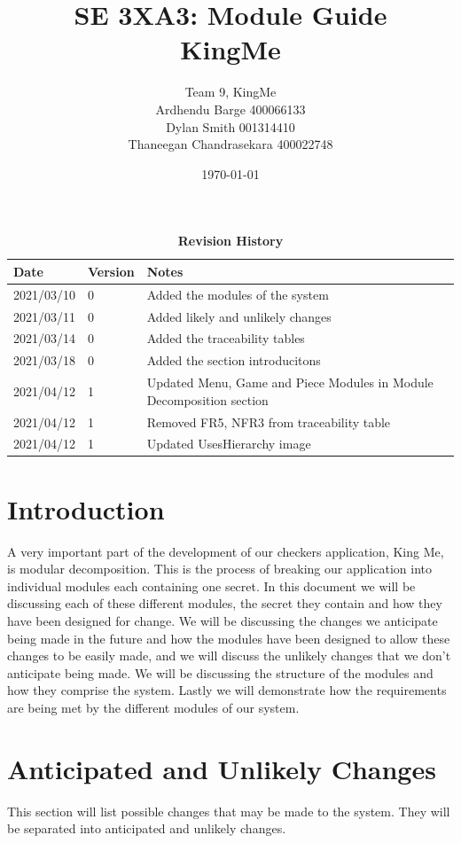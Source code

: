 \documentclass[12pt, titlepage]{article}
\title{SE 3XA3: Module Guide\\KingMe}
\author{Team 9, KingMe
		\\ Ardhendu Barge 400066133
		\\ Dylan Smith 001314410
		\\ Thaneegan Chandrasekara 400022748
}
\date{\today}
\begin{document}
\maketitle

\tableofcontents
\listoftables
\listoffigures

\begin{table}[!ht]
\caption{\bf Revision History}
\begin{tabularx}{\textwidth}{p{3cm}p{2cm}X}
\toprule {\bf Date} & {\bf Version} & {\bf Notes}\\
\midrule
2021/03/10 & 0 & Added the modules of the system\\
2021/03/11 & 0 & Added likely and unlikely changes\\
2021/03/14 & 0 & Added the traceability tables\\
2021/03/18 & 0 & Added the section introducitons\\
2021/04/12 & 1 & Updated Menu, Game and Piece Modules in Module Decomposition section\\
2021/04/12 & 1 & Removed FR5, NFR3 from traceability table\\
2021/04/12 & 1 & Updated UsesHierarchy image\\
\bottomrule
\end{tabularx}
\end{table}

\newpage


\section{Introduction}

A very important part of the development of our checkers application, King Me, is modular decomposition. This is the process of breaking our application into individual modules each containing one secret. In this document we will be discussing each of these different modules, the secret they contain and how they have been designed for change. We will be discussing the changes we anticipate being made in the future and how the modules have been designed to allow these changes to be easily made, and we will discuss the unlikely changes that we don't anticipate being made. We will be discussing the structure of the modules and how they comprise the system. Lastly we will demonstrate how the requirements are being met by the different modules of our system.

\section{Anticipated and Unlikely Changes} \label{SecChange}
This section will list possible changes that may be made to the system. They will be separated into anticipated and unlikely changes.
\end{document}
